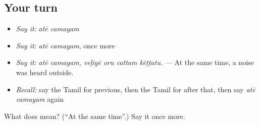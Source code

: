 \subsection*{Your turn}
\begin{itemize}
\raggedright
  \item \emph{Say it:} \emph{atē camayam}
  \item \emph{Say it:} \emph{atē camayam}, once more
  \item \emph{Say it:} \emph{atē camayam, veḷiyē oru cattam kēṭṭatu.} — At the same time, a noise was heard outside.
  \item \emph{Recall:} say the Tamil for previous, then the Tamil for after that, then say \emph{atē camayam} again
\end{itemize}

\begin{tcolorbox}[breakable,colback=teal!4,colframe=teal!35!black,title={Before you move on}]
What does   mean? (\textquotedblleft{}At the same time\textquotedblright{}.) Say it once more.
\end{tcolorbox}
